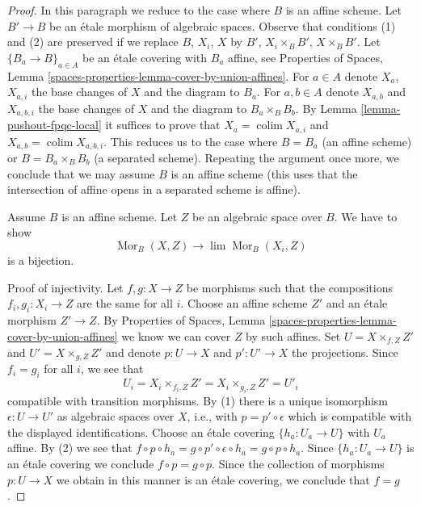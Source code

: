\documentclass[10pt,a4paper]{amsart}
\theoremstyle{plain}
\theoremstyle{definition}
\theoremstyle{remark}
\numberwithin{equation}{subsection}
\def\lim{\mathop{\mathrm{lim}}\nolimits}
\def\colim{\mathop{\mathrm{colim}}\nolimits}
\def\Mor{\mathop{\mathrm{Mor}}\nolimits}
\begin{document}
\begin{proof}
In this paragraph we reduce to the case where $B$ is an affine scheme.
Let $B' \to B$ be an \'etale morphism of algebraic spaces.
Observe that conditions (1) and (2) are preserved if we replace
$B$, $X_i$, $X$ by $B'$, $X_i \times_B B'$, $X \times_B B'$.
Let $\{B_a \to B\}_{a \in A}$ be an \'etale covering with $B_a$
affine, see Properties of Spaces, Lemma
\ref{spaces-properties-lemma-cover-by-union-affines}.
For $a \in A$ denote $X_a$, $X_{a, i}$ the base changes of $X$ and the
diagram to $B_a$. For $a, b \in A$ denote
$X_{a, b}$ and $X_{a, b, i}$ the base changes of $X$ and the
diagram to $B_a \times_B B_b$.
By Lemma \ref{lemma-pushout-fpqc-local}
it suffices to prove that $X_a = \colim X_{a, i}$ and
$X_{a, b} = \colim X_{a, b, i}$.
This reduces us to the case where $B = B_a$ (an affine scheme) or
$B = B_a \times_B B_b$ (a separated scheme). Repeating the
argument once more, we conclude that we may assume $B$ is
an affine scheme (this uses that the intersection of affine
opens in a separated scheme is affine).

\medskip\noindent
Assume $B$ is an affine scheme. Let $Z$ be an algebraic space over $B$.
We have to show
$$
\Mor_B(X, Z) \longrightarrow \lim \Mor_B(X_i, Z)
$$
is a bijection.

\medskip\noindent
Proof of injectivity. Let $f, g : X \to Z$ be morphisms
such that the compositions $f_i, g_i : X_i \to Z$ are the same for all $i$.
Choose an affine scheme $Z'$ and an \'etale morphism $Z' \to Z$. By
Properties of Spaces, Lemma \ref{spaces-properties-lemma-cover-by-union-affines}
we know we can cover $Z$ by such affines. Set $U = X \times_{f, Z} Z'$
and $U' = X \times_{g, Z} Z'$ and denote $p : U \to X$ and $p' : U' \to X$
the projections. Since $f_i = g_i$ for all $i$, we see that
$$
U_i = X_i \times_{f_i, Z} Z' = X_i \times_{g_i, Z} Z' = U'_i
$$
compatible with transition morphisms. By (1) there is a unique isomorphism
$\epsilon : U \to U'$ as algebraic spaces over $X$, i.e., with
$p = p' \circ \epsilon$ which is compatible with
the displayed identifications. Choose an \'etale covering
$\{h_a : U_a \to U\}$ with $U_a$ affine.
By (2) we see that $f \circ p \circ h_a = g \circ p' \circ \epsilon \circ h_a =
g \circ p \circ h_a$. Since $\{h_a : U_a \to U\}$ is an \'etale covering
we conclude $f \circ p = g \circ p$.
Since the collection of morphisms $p : U \to X$ we obtain
in this manner is an \'etale covering, we conclude that $f = g$.


\end{proof}
\end{document}
